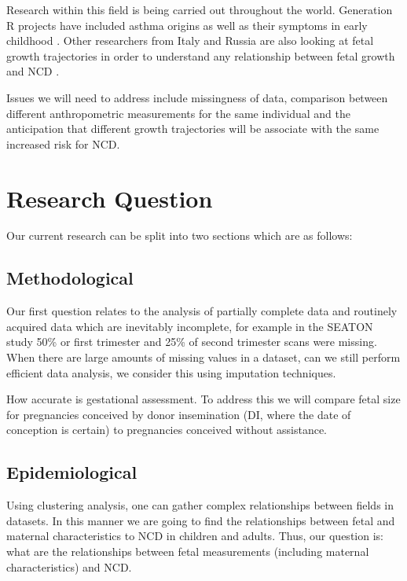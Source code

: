 \documentclass[bsc]{abdnthesis}
\begin{document}
Research within this field is being carried out throughout the world. Generation R projects have included asthma origins \cite{ generation-r1} as well as their symptoms in early childhood \cite{ generation-r2}. Other researchers from Italy and Russia are also looking at fetal growth trajectories in order to understand any relationship between fetal growth and NCD \cite{luccia1, luccia2, luccia3, luccia4}.

Issues we will need to address include missingness of data, comparison between different anthropometric measurements for the same individual and the anticipation that different growth trajectories will be associate with the same increased risk for NCD.   
\section{Research Question} %
\label{sec:research_question}
Our current research can be split into two sections which are as follows:
\subsection{Methodological} %
\label{sub:methodological}
Our first question relates to the analysis of partially complete data and routinely acquired data which are inevitably incomplete, for example in the SEATON study \cite{turner4, turner5} 50\% or first trimester and 25\% of second trimester scans were missing. When there are large amounts of missing values in a dataset, can we still perform efficient data analysis, we consider this using imputation techniques. 

How accurate is gestational assessment. To address this we will compare fetal size for pregnancies conceived by donor insemination (DI, where the date of conception is certain) to pregnancies conceived without assistance. 
\subsection{Epidemiological} %
\label{sub:epidemiological}
Using clustering analysis, one can gather complex relationships between fields in datasets. In this manner we are going to find the relationships between fetal and maternal characteristics to NCD in children and adults. Thus, our question is: what are the relationships between fetal measurements (including maternal characteristics) and NCD. 
\end{document}
